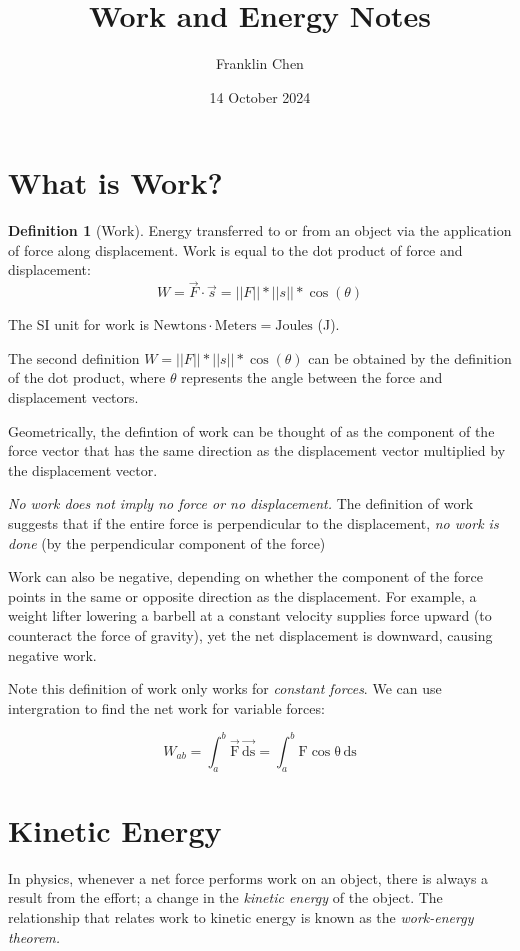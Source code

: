 \documentclass[12pt, a4paper]{article}
\title{Work and Energy Notes}
\author{Franklin Chen}
\date{14 October 2024}
\theoremstyle{definition}
\newtheorem{definition}{Definition}
\begin{document}
\maketitle
\newpage

\tableofcontents

\section{What is Work?}

\begin{definition}[Work]
Energy transferred to or from an object via the application of force along displacement. Work is equal to the dot product of force and displacement:
\[W = \vec{F} \cdot{} \vec{s} = ||F|| * ||s|| * \cos(\theta)\]

The SI unit for work is $\mathrm{Newtons \cdot{} Meters = Joules}$ (J).
\end{definition}
The second definition $W = ||F|| * ||s|| * \cos(\theta)$ can be obtained by the definition of the dot product, where $\theta$ represents the angle between the force and displacement vectors.

Geometrically, the defintion of work can be thought of as the component of the force vector that has the same direction as the displacement vector multiplied by the displacement vector.

\emph{No work does not imply no force or no displacement.} The definition of work suggests that if the entire force is perpendicular to the displacement, \emph{no work is done} (by the perpendicular component of the force)

Work can also be negative, depending on whether the component of the force points in the same or opposite direction as the displacement. For example, a weight lifter lowering a barbell at a constant velocity supplies force upward (to counteract the force of gravity), yet the net displacement is downward, causing negative work.

Note this definition of work only works for \emph{constant forces}. We can use intergration to find the net work for variable forces:

\[W_{ab} = \int_{a}^{b} \mathrm{\vec{F} \, \vec{ds}} = \int_{a}^{b} \mathrm{F\cos{\theta}\, ds}\]
\newpage

\section{Kinetic Energy}
In physics, whenever a net force performs work on an object, there is always a result from the effort; a change in the \emph{kinetic energy} of the object. The relationship that relates work to kinetic energy is known as the \emph{work-energy theorem.}\newline
\end{document}
